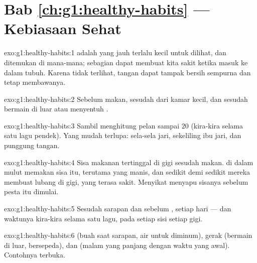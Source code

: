 \section*{Bab \ref{ch:g1:healthy-habits} --- Kebiasaan Sehat}

\begin{solution}{exo:g1:healthy-habits:1}
 adalah  yang jauh terlalu kecil untuk dilihat, dan
ditemukan di mana-mana; sebagian dapat membuat kita sakit ketika masuk
ke dalam tubuh. Karena tidak terlihat, tangan dapat tampak bersih
sempurna dan tetap membawanya.
\end{solution}

\begin{solution}{exo:g1:healthy-habits:2}
Sebelum makan, sesudah dari kamar kecil, dan sesudah bermain di luar
atau menyentuh .
\end{solution}

\begin{solution}{exo:g1:healthy-habits:3}
Sambil menghitung pelan sampai $20$ (kira-kira selama satu lagu
pendek). Yang mudah terlupa: sela-sela jari, sekeliling ibu jari, dan
punggung tangan.
\end{solution}

\begin{solution}{exo:g1:healthy-habits:4}
Sisa makanan tertinggal di gigi sesudah makan.  di dalam mulut
memakan sisa itu, terutama yang manis, dan sedikit demi sedikit mereka
membuat lubang di gigi, yang terasa sakit. Menyikat menyapu sisanya
sebelum pesta itu dimulai.
\end{solution}

\begin{solution}{exo:g1:healthy-habits:5}
Sesudah sarapan dan sebelum , setiap hari --- dan waktunya
kira-kira selama satu lagu, pada setiap sisi setiap gigi.
\end{solution}

\begin{solution}{exo:g1:healthy-habits:6}
 (buah saat sarapan, air untuk diminum), gerak (bermain
di luar, bersepeda), dan  (malam yang panjang dengan waktu 
yang awal). Contohnya terbuka.
\end{solution}

